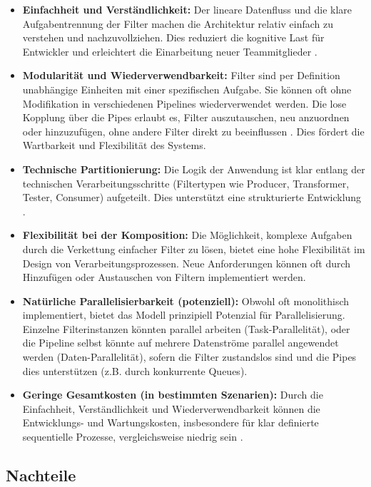 \documentclass[11pt, a4paper]{article}
\begin{document}
\begin{itemize}
    \item \textbf{Einfachheit und Verständlichkeit:} Der lineare Datenfluss und die klare Aufgabentrennung der Filter machen die Architektur relativ einfach zu verstehen und nachzuvollziehen. Dies reduziert die kognitive Last für Entwickler und erleichtert die Einarbeitung neuer Teammitglieder \cite{RichardsFord2020}.
    \item \textbf{Modularität und Wiederverwendbarkeit:} Filter sind per Definition unabhängige Einheiten mit einer spezifischen Aufgabe. Sie können oft ohne Modifikation in verschiedenen Pipelines wiederverwendet werden. Die lose Kopplung über die Pipes erlaubt es, Filter auszutauschen, neu anzuordnen oder hinzuzufügen, ohne andere Filter direkt zu beeinflussen \cite{RichardsFord2020}. Dies fördert die Wartbarkeit und Flexibilität des Systems.
    \item \textbf{Technische Partitionierung:} Die Logik der Anwendung ist klar entlang der technischen Verarbeitungsschritte (Filtertypen wie Producer, Transformer, Tester, Consumer) aufgeteilt. Dies unterstützt eine strukturierte Entwicklung \cite{RichardsFord2020}.
    \item \textbf{Flexibilität bei der Komposition:} Die Möglichkeit, komplexe Aufgaben durch die Verkettung einfacher Filter zu lösen, bietet eine hohe Flexibilität im Design von Verarbeitungsprozessen. Neue Anforderungen können oft durch Hinzufügen oder Austauschen von Filtern implementiert werden.
    \item \textbf{Natürliche Parallelisierbarkeit (potenziell):} Obwohl oft monolithisch implementiert, bietet das Modell prinzipiell Potenzial für Parallelisierung. Einzelne Filterinstanzen könnten parallel arbeiten (Task-Parallelität), oder die Pipeline selbst könnte auf mehrere Datenströme parallel angewendet werden (Daten-Parallelität), sofern die Filter zustandslos sind und die Pipes dies unterstützen (z.B. durch konkurrente Queues).
    \item \textbf{Geringe Gesamtkosten (in bestimmten Szenarien):} Durch die Einfachheit, Verständlichkeit und Wiederverwendbarkeit können die Entwicklungs- und Wartungskosten, insbesondere für klar definierte sequentielle Prozesse, vergleichsweise niedrig sein \cite{RichardsFord2020}.
\end{itemize}

\subsection{Nachteile}
\end{document}
